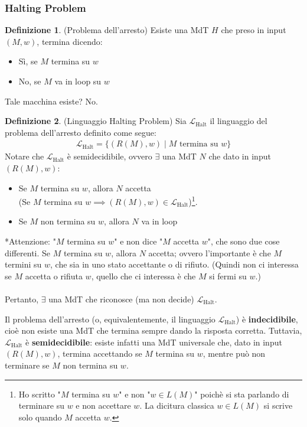 \documentclass{article}  %
\theoremstyle{definition}
\newtheorem{definition}{Definizione}[section]
\begin{document}
\subsubsection{Halting Problem}
\begin{definition}(Problema dell'arresto)
  Esiste una MdT $H$ che preso in input $(M,w)$, termina dicendo:
  \begin{itemize}
    \item Sì, se $M$ termina su $w$ 
    \item No, se $M$ va in loop su $w$
  \end{itemize}
  Tale macchina esiste? No.
\end{definition}
\begin{definition}(Linguaggio Halting Problem) Sia $\mathcal{L}_{\text{Halt}}$ il linguaggio del problema dell'arresto definito come segue:
  \begin{align*}
    \mathcal{L}_{\text{Halt}} = \{(R(M),w) \mid M \text{ termina su } w\}
  \end{align*}
  Notare che $\mathcal{L}_{\text{Halt}}$ è semidecidibile, ovvero $\exists$ una MdT $N$ che dato in input $(R(M),w)$:
  \begin{itemize}
    \item Se $M$ termina su $w$, allora $N$ accetta \\ (Se $M$ termina su $w \implies (R(M),w) \in \mathcal{L}_{\text{Halt}}$)\footnote{Ho scritto
     "$M$ termina su $w$" e non "$w \in L(M)$" poichè si sta parlando di terminare su $w$ e non accettare $w$. La dicitura 
    classica $w \in L(M)$ si scrive solo quando $M$ accetta $w$.}. 
    \item Se $M$ non termina su $w$, allora $N$ va in loop
  \end{itemize}
    *Attenzione: "$M$ termina su $w$" e non dice "$M$ accetta $w$", che sono due cose differenti.
  Se $M$ termina su $w$, allora $N$ accetta; ovvero l'importante è che $M$ termini su $w$, che sia in uno stato accettante o di rifiuto. (Quindi non ci interessa
  se $M$ accetta o rifiuta $w$, quello che ci interessa è che $M$ si fermi su $w$.) \\ \\
  Pertanto, $\exists$ una MdT che riconosce (ma non decide) $\mathcal{L}_{\text{Halt}}$.
\end{definition}

\begin{osservazioni}[Osservazione]
\footnotesize %
Il problema dell'arresto (o, equivalentemente, il linguaggio 
$\mathcal{L}_{\text{Halt}}$) è \textbf{indecidibile}, cioè non esiste una MdT che
termina sempre dando la risposta corretta. 
Tuttavia, $\mathcal{L}_{\text{Halt}}$ è \textbf{semidecidibile}: esiste infatti una MdT universale che, dato in input 
$(R(M),w)$, termina accettando se $M$ termina su $w$, mentre può non
terminare se $M$ non termina su $w$.
\end{osservazioni}
\end{document}
